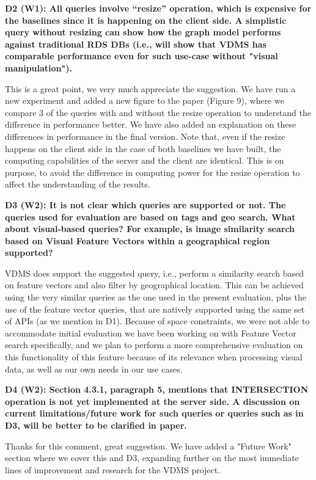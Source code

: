\documentclass[11pt]{proposalnsf}
\begin{document}
\bigskip
\noindent %
\textbf{
D2 (W1): All queries involve “resize” operation, which is expensive for the
baselines since it is happening on the client side.
A simplistic query without resizing can show how the graph model performs
against traditional RDS DBs (i.e., will show that VDMS has comparable
performance even for such use-case without "visual manipulation").
}\bigskip

This is a great point, we very much appreciate the suggestion.
We have run a new experiment and added a new figure to the paper (Figure 9),
where we compare 3 of the queries with and without the resize operation
to understand the difference in performance better.
We have also added an explanation on these differences in performance
in the final version.
Note that, even if the resize happens on the client side in the case of both
baselines we have built, the computing capabilities of the server and the
client are identical.
This is on purpose, to avoid the difference in computing power for the
resize operation to affect the understanding of the results.


\bigskip
\noindent %
\textbf{
D3 (W2): It is not clear which queries are supported or not.
The queries used for evaluation are based on tags and geo search.
What about visual-based queries? For example, is image similarity search based
on Visual Feature Vectors within a geographical region supported?
}\bigskip

VDMS does support the suggested query, i.e., perform a similarity search based
on feature vectors and also filter by geographical location.
This can be achieved using the very similar queries as the one used in
the present evaluation, plus the use of the feature vector queries,
that are natively supported using the same set of APIs (as we mention in D1).
Because of space constraints, we were not able to accommodate initial evaluation
we have been working on with Feature Vector search specifically,
and we plan to perform a more comprehensive evaluation on this functionality
of this feature because of its relevance when processing visual data, as well
as our own needs in our use cases.

\bigskip
\noindent %
\textbf{
D4 (W2): Section 4.3.1, paragraph 5, mentions that INTERSECTION operation is not
yet implemented at the server side.
A discussion on current limitations/future work for such queries or queries
such as in D3, will be better to be clarified in paper.
}\bigskip

Thanks for this comment, great suggestion.
We have added a "Future Work" section where we cover this and D3,
expanding further on the most immediate lines of improvement and
research for the VDMS project.
\end{document}
